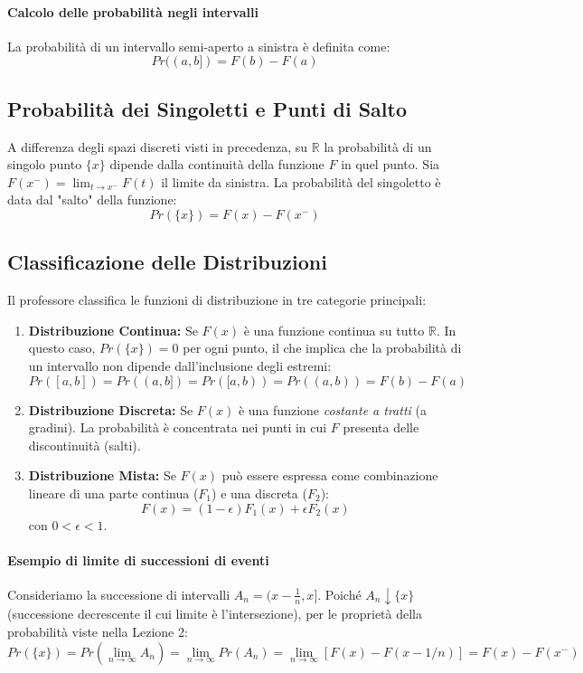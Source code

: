 \documentclass[12pt, a4paper]{article}
\begin{document}
\paragraph{Calcolo delle probabilità negli intervalli}
La probabilità di un intervallo semi-aperto a sinistra è definita come:
$$ Pr((a, b]) = F(b) - F(a) $$

\subsection{Probabilità dei Singoletti e Punti di Salto}
A differenza degli spazi discreti visti in precedenza, su $\mathbb{R}$ la probabilità di un singolo punto $\{x\}$ dipende dalla continuità della funzione $F$ in quel punto.
Sia $F(x^-) = \lim_{t \to x^-} F(t)$ il limite da sinistra. La probabilità del singoletto è data dal "salto" della funzione:
$$ Pr(\{x\}) = F(x) - F(x^-) $$

\subsection{Classificazione delle Distribuzioni}
Il professore classifica le funzioni di distribuzione in tre categorie principali:

\begin{enumerate}
    \item \textbf{Distribuzione Continua:} Se $F(x)$ è una funzione continua su tutto $\mathbb{R}$. 
    In questo caso, $Pr(\{x\}) = 0$ per ogni punto, il che implica che la probabilità di un intervallo non dipende dall'inclusione degli estremi:
    $$ Pr([a, b]) = Pr((a, b]) = Pr([a, b)) = Pr((a, b)) = F(b) - F(a) $$
    
    \item \textbf{Distribuzione Discreta:} Se $F(x)$ è una funzione \textit{costante a tratti} (a gradini). La probabilità è concentrata nei punti in cui $F$ presenta delle discontinuità (salti).
    
    \item \textbf{Distribuzione Mista:} Se $F(x)$ può essere espressa come combinazione lineare di una parte continua ($F_1$) e una discreta ($F_2$):
    $$ F(x) = (1 - \epsilon)F_1(x) + \epsilon F_2(x) $$
    con $0 < \epsilon < 1$.
\end{enumerate}

\paragraph{Esempio di limite di successioni di eventi}
Consideriamo la successione di intervalli $A_n = (x - \frac{1}{n}, x]$. Poiché $A_n \downarrow \{x\}$ (successione decrescente il cui limite è l'intersezione), per le proprietà della probabilità viste nella Lezione 2:
$$ Pr(\{x\}) = Pr\left(\lim_{n \to \infty} A_n\right) = \lim_{n \to \infty} Pr(A_n) = \lim_{n \to \infty} [F(x) - F(x - 1/n)] = F(x) - F(x^-) $$
\end{document}
